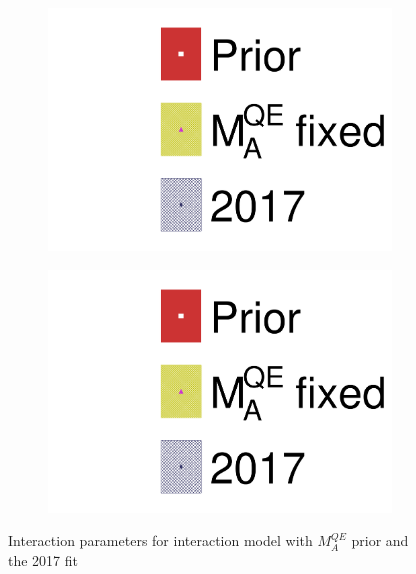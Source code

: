 \begin{figure}[h]
	\begin{subfigure}[t]{0.49\textwidth}
		\includegraphics[width=\textwidth, trim={0mm 0mm 0mm 0mm}, clip,page=20]{figures/mach3/data/alt/2017b_MAQEBC_Data_merg_2017b_NewData_NewDet_UpdXsecStep_2Xsec_4Det_5Flux_0.pdf}
	\end{subfigure}
	\begin{subfigure}[t]{0.49\textwidth}
		\includegraphics[width=\textwidth, trim={0mm 0mm 0mm 0mm}, clip,page=21]{figures/mach3/data/alt/2017b_MAQEBC_Data_merg_2017b_NewData_NewDet_UpdXsecStep_2Xsec_4Det_5Flux_0.pdf}
	\end{subfigure}
	\caption{Interaction parameters for interaction model with $M_A^{QE}$ prior and the 2017 fit}
	\label{fig:maqe_prior_xsec}
\end{figure}

